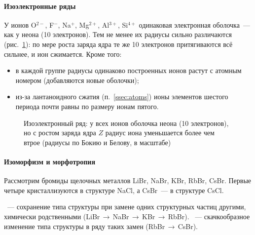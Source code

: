 \paragraph{Изоэлектронные ряды}
У ионов O$^{2-}$, F$^-$, Na$^+$, Mg$^{2+}$, Al$^{3+}$, Si$^{4+}$ одинаковая
электронная оболочка~— как у неона (10 электронов). Тем не менее их
радиусы сильно различаются (рис.~\ref{fig:isoelectronic}): по мере роста
заряда ядра те же 10 электронов притягиваются всё сильнее, и ион
сжимается. Кроме того:
\begin{itemize}
\item в каждой группе радиусы одинаково построенных ионов растут с
атомным номером (добавляются новые оболочки);
\item из-за лантаноидного сжатия (п.~\ref{ssec:atoms}) ионы элементов
шестого периода почти равны по размеру ионам пятого.
\end{itemize}

\begin{figure}[ht]
\centering
{}
\caption{Изоэлектронный ряд: у всех ионов оболочка неона (10 электронов),
но с ростом заряда ядра $Z$ радиус иона уменьшается более чем втрое
(радиусы по Бокию и Белову, в масштабе)}
\label{fig:isoelectronic}
\end{figure}

\paragraph{Изоморфизм и морфотропия}
Рассмотрим бромиды щелочных металлов LiBr, NaBr, KBr, RbBr, CsBr. Первые
четыре кристаллизуются в структуре NaCl, а CsBr~— в структуре CsCl.

\begin{opredelenie}
~— сохранение типа структуры при замене одних
структурных частиц другими, химически родственными (LiBr\,$\to$\,NaBr\,$\to$\,KBr\,$\to$\,RbBr).
~— скачкообразное изменение типа структуры в ряду
таких замен (RbBr\,$\to$\,CsBr).
\end{opredelenie}

